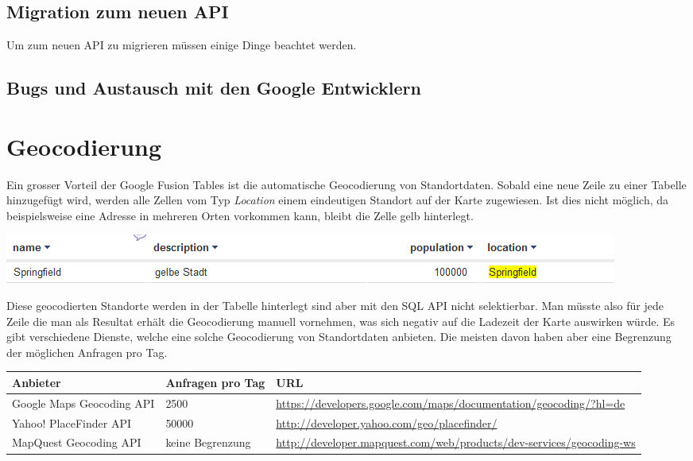 \subsection{Migration zum neuen API}
Um zum neuen API zu migrieren müssen einige Dinge beachtet werden.


\subsection{Bugs und Austausch mit den Google Entwicklern}

\section{Geocodierung}
Ein grosser Vorteil der Google Fusion Tables ist die automatische 
\gls{Geocodierung} von Standortdaten. Sobald eine neue Zeile zu einer Tabelle hinzugefügt wird, werden alle Zellen vom Typ \emph{Location} einem eindeutigen Standort auf der Karte zugewiesen. Ist dies nicht möglich, da beispielsweise eine Adresse in mehreren Orten vorkommen kann, bleibt die Zelle gelb hinterlegt.
 
\includegraphics[scale=0.75]{images/geocoding_failed.png}

Diese geocodierten Standorte werden in der Tabelle hinterlegt sind aber mit den SQL API nicht selektierbar. Man müsste also für jede Zeile die man als Resultat erhält die Geocodierung manuell vornehmen, was sich negativ auf die Ladezeit der Karte auswirken würde.
Es gibt verschiedene Dienste, welche eine solche Geocodierung von Standortdaten anbieten. Die meisten davon haben aber eine Begrenzung der möglichen Anfragen pro Tag.

\begin{longtable}{|l|p{1.9cm}|p{7.3cm}|}
\hline 
\textbf{Anbieter} & \textbf{Anfragen pro Tag} & \textbf{URL} \\ 
\hline 
Google Maps Geocoding API & 2500 & \url{https://developers.google.com/maps/documentation/geocoding/?hl=de} \\ 
\hline 
Yahoo! PlaceFinder API & 50000 & \url{http://developer.yahoo.com/geo/placefinder/} \\ 
\hline 
MapQuest Geocoding API & keine Begrenzung & \url{http://developer.mapquest.com/web/products/dev-services/geocoding-ws} \\ 
\hline 
\end{longtable} 

